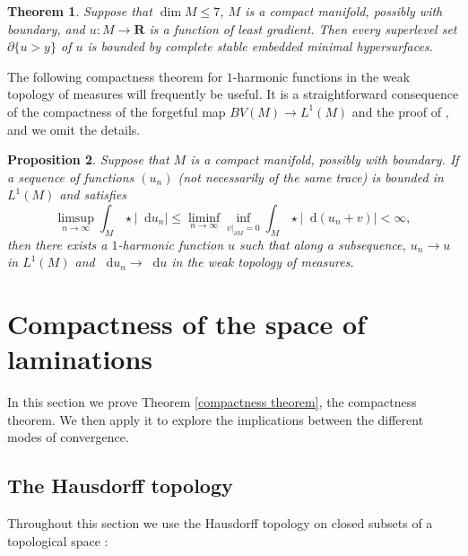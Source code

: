 \documentclass[reqno,11pt]{amsart}
\newcommand{\RR}{\mathbf{R}}
\newcommand*\dif{\mathop{}\!\mathrm{d}}
\newtheorem{theorem}{Theorem}[section]
\newtheorem{proposition}[theorem]{Proposition}
\theoremstyle{definition}
\numberwithin{equation}{section}
\begin{document}
\begin{theorem}\label{main thm of old paper}
Suppose that $\dim M \leq 7$, $M$ is a compact manifold, possibly with boundary, and $u: M \to \RR$ is a function of least gradient.
Then every superlevel set $\partial \{u > y\}$ of $u$ is bounded by complete stable embedded minimal hypersurfaces.
\end{theorem}

The following compactness theorem for $1$-harmonic functions in the weak topology of measures will frequently be useful.
It is a straightforward consequence of the compactness of the forgetful map $BV(M) \to L^1(M)$ and the proof of \cite[Osservazione 3]{Miranda67}, and we omit the details.

\begin{proposition}\label{MirandaStability}
  Suppose that $M$ is a compact manifold, possibly with boundary.
	If a sequence of functions $(u_n)$ (not necessarily of the same trace) is bounded in $L^1(M)$ and satisfies
\begin{equation}\label{boundedness in Miranda}
	\limsup_{n \to \infty} \int_M \star |\dif u_n| \leq \liminf_{n \to \infty} \inf_{v|_{\partial M} = 0} \int_M \star |\dif(u_n + v)| < \infty,
\end{equation}
	then there exists a $1$-harmonic function $u$ such that along a subsequence, $u_n \to u$ in $L^1(M)$ and $\dif u_n \to \dif u$ in the weak topology of measures.
\end{proposition}



\section{Compactness of the space of laminations}\label{CompactnessSec}
In this section we prove Theorem \ref{compactness theorem}, the compactness theorem.
We then apply it to explore the implications between the different modes of convergence.

\subsection{The Hausdorff topology}
Throughout this section we use the Hausdorff topology on closed subsets of a topological space \cite[Chapter IV]{nadler2017continuum}:
\end{document}
